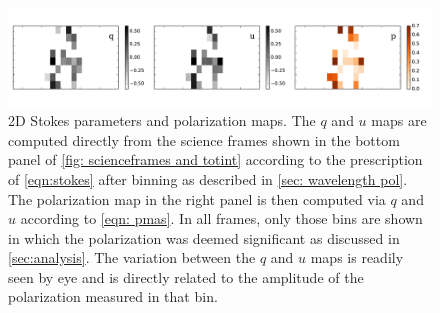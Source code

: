 \begin{table}
	\begin{center}
	\caption[Polarization signal-to-noise and fractional polarization for spatial binning of LAB1]{}
	\end{center}

	\label{table: bigboxCLs}
\end{table}

\begin{figure}
\begin{center}
\includegraphics[width=\linewidth]{Figures/lyapol/f8_v2.pdf}
\caption[2D Stokes parameters and polarization map of LAB1]{2D Stokes parameters and polarization maps. The $q$ and $u$ maps are computed directly from the science frames shown in the bottom panel of \autoref{fig: scienceframes and totint} according to the prescription of \autoref{eqn:stokes} after binning as described in \autoref{sec: wavelength pol}. The polarization map in the right panel is then computed via $q$ and $u$ according to \autoref{eqn: pmas}. In all frames, only those bins are shown in which the polarization was deemed significant as discussed in \autoref{sec:analysis}. The variation between the $q$ and $u$ maps is readily seen by eye and is directly related to the amplitude of the polarization measured in that bin.}
\label{fig: QU}
\end{center}
\end{figure}

